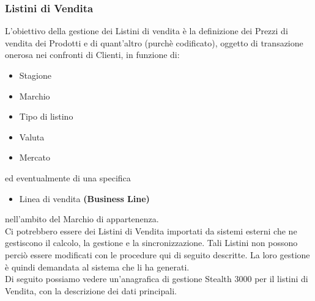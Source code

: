 \subsubsection{Listini di Vendita}
L'obiettivo della gestione dei Listini di vendita è la definizione dei Prezzi di vendita dei Prodotti e di quant’altro (purchè codificato), oggetto di transazione onerosa nei confronti di Clienti, in funzione di:
\begin{itemize}
\item Stagione
\item Marchio
\item Tipo di listino
\item Valuta
\item Mercato
\end{itemize}
ed eventualmente di una specifica
\begin{itemize}
\item Linea di vendita \textbf{(Business Line)}
\end{itemize}
nell’ambito del Marchio di appartenenza.\\
Ci potrebbero essere dei Listini di Vendita importati da sistemi esterni che ne gestiscono il calcolo, la gestione e la sincronizzazione. Tali Listini non possono perciò essere modificati con le procedure qui di seguito descritte. La loro gestione è quindi demandata al sistema che li ha generati.\\
Di seguito possiamo vedere un'anagrafica di gestione Stealth 3000 per il listini di Vendita, con la descrizione dei dati principali.\\


